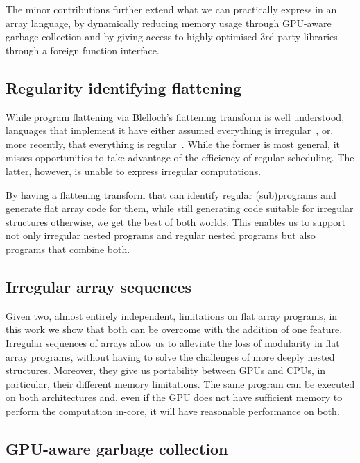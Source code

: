 The minor contributions further extend what we can practically express in an array language, by dynamically reducing memory usage through GPU-aware garbage collection and by giving access to highly-optimised 3rd party libraries through a foreign function interface.

\subsection{Regularity identifying flattening}

While program flattening via Blelloch's flattening transform is well understood, languages that implement it have either assumed everything is irregular~\cite{Blelloch:nesl1995,bergstrom:ndp2gpu,Chakravarty:DPH,Fluet:2007:manticore,proteus-frontiers95}, or, more recently, that everything is regular~\cite{Henriksen:2017futhark}. While the former is most general, it misses opportunities to take advantage of the efficiency of regular scheduling. The latter, however, is unable to express irregular computations.

By having a flattening transform that can identify regular (sub)programs and generate flat array code for them, while still generating code suitable for irregular structures otherwise, we get the best of both worlds. This enables us to support not only irregular nested programs and regular nested programs but also programs that combine both.

\subsection{Irregular array sequences}

Given two, almost entirely independent, limitations on flat array programs, in this work we show that both can be overcome with the addition of one feature. Irregular sequences of arrays allow us to alleviate the loss of modularity in flat array programs, without having to solve the challenges of more deeply nested structures. Moreover, they give us portability between GPUs and CPUs, in particular, their different memory limitations. The same program can be executed on both architectures and, even if the GPU does not have sufficient memory to perform the computation in-core, it will have reasonable performance on both.

\subsection{GPU-aware garbage collection}

